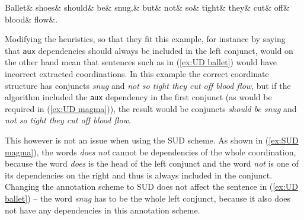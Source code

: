 {\small
\begin{exe}
\ex\label{ex:UD ballet}
\begin{dependency}[hide label, baseline=-\the\dimexpr\fontdimen22\textfont2\relax]
    \begin{deptext}
        Ballet\& shoes\& should\& be\& snug,\& but\& not\& so\& tight\& they\& cut\& off\& blood\& flow\&.\footnotemark\\
    \end{deptext}
\end{dependency}
\end{exe}
}

Modifying the heuristics, so that they fit this example, for instance by saying that \texttt{aux} dependencies should always be included in the left conjunct, would on the other hand mean that sentences such as in (\ref{ex:UD ballet}) would have incorrect extracted coordinations. In this example the correct coordinate structure has conjuncts \textsl{snug} and \textsl{not so tight they cut off blood flow}, but if the algorithm included the \texttt{aux} dependency in the first conjunct (as would be required in (\ref{ex:UD magma})), the result would be conjuncts \textsl{should be snug} and \textsl{not so tight they cut off blood flow}.

This however is not an issue when using the SUD scheme. As shown in (\ref{ex:SUD magma}), the words \textsl{does not} cannot be dependencies of the whole coordination, because the word \textsl{does} is the head of the left conjunct and the word \textsl{not} is one of its dependencies on the right and thus is always included in the conjunct. Changing the annotation scheme to SUD does not affect the sentence in (\ref{ex:UD ballet}) -- the word \textsl{snug} has to be the whole left conjunct, because it also does not have any dependencies in this annotation scheme.


